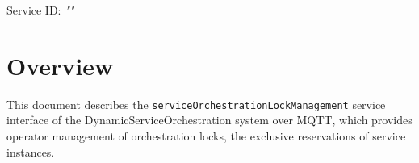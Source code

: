 \documentclass[a4paper]{arrowhead}
\begin{document}
\sloppy

\ArrowheadSetup

\begin{center}
  \vspace*{1cm}
  \huge{\arrowtitle}

  \vspace*{0.2cm}
  \LARGE{\arrowtype}
  \vspace*{1cm}

  \Large{Service ID: \textit{"\arrowid"}}

  \vspace*{\fill}


  \vspace*{1cm}
  \vspace*{\fill}

  \begin{abstract}
    This document describes the MQTT protocol with TLS payload security and JSON payload encoding variant of the \texttt{service\allowbreak{}Orchestration\allowbreak{}Lock\allowbreak{}Management} service of the DynamicServiceOrchestration system.
  \end{abstract}

  \vspace*{1cm}
\end{center}

\newpage

\tableofcontents
\newpage

\section{Overview}
\label{sec:overview}

This document describes the \texttt{service\allowbreak{}Orchestration\allowbreak{}Lock\allowbreak{}Management} service interface of the DynamicServiceOrchestration system over MQTT, which provides operator management of orchestration locks, the exclusive reservations of service instances.
\end{document}
